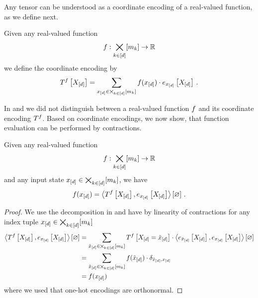 Any tensor can be understood as a coordinate encoding of a real-valued function, as we define next.

\begin{definition}
    Given any real-valued function
    \begin{align*}
        f: \bigtimes_{k\in[d]}[m_{k}] \rightarrow \mathbb{R}
    \end{align*}
    we define the coordinate encoding by
    \begin{align*}
        T^{f}\left[X_{[d]}\right]
        = \sum_{x_{[d]}\in\bigtimes_{k\in[d]}[m_{k}]} f(x_{[d]}) \cdot e_{x_{[d]}}\left[X_{[d]}\right] \, .
    \end{align*}
\end{definition}

In  and  we did not distinguish between a real-valued function $f$ and its coordinate encoding $T^{f}$.
Based on coordinate encodings, we now show, that function evaluation can be performed by contractions.

\begin{theorem}
    \label{the:coordinateCalculus}
    Given any real-valued function
    \begin{align*}
        f : \bigtimes_{k\in[d]}[m_{k}] \rightarrow \mathbb{R}
    \end{align*}
    and any input state $x_{[d]}\in\bigtimes_{k\in[d]}[m_{k}]$, we have
    \begin{align*}
        f(x_{[d]})
        = \left\langle T^{f}\left[X_{[d]}\right],e_{x_{[d]}}\left[X_{[d]}\right]\right\rangle \left[ \varnothing \right] \, .
    \end{align*}
\end{theorem}
\begin{proof}
    We use the decomposition in  and have by linearity of contractions for any index tuple $x_{[d]}\in\bigtimes_{k\in[d]}[m_{k}]$
    \begin{align*}
        \left\langle T^{f}\left[X_{[d]}\right],e_{x_{[d]}}\left[X_{[d]}\right]\right\rangle \left[ \varnothing \right]
        & = \sum_{\tilde{x}_{[d]}\in\bigtimes_{k\in[d]}[m_{k}]}
        T^{f}\left[X_{[d]}=\tilde{x}_{[d]}\right]
        \cdot \left\langle e_{\tilde{x}_{[d]}}\left[X_{[d]}\right],e_{x_{[d]}}\left[X_{[d]}\right]\right\rangle \left[ \varnothing \right] \\
        & = \sum_{\tilde{x}_{[d]}\in\bigtimes_{k\in[d]}[m_{k}]}
        f(\tilde{x}_{[d]})
        \cdot \delta_{\tilde{x}_{[d]},x_{[d]}} \\
        & = f(x_{[d]})
    \end{align*}
    where we used that one-hot encodings are orthonormal.
\end{proof}

